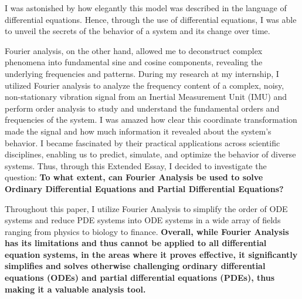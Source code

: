 \noindent
I was astonished by how elegantly this model was described in the language of differential equations. Hence, through the use of differential equations, I was able to unveil the secrets of the behavior of a system and its change over time. 

Fourier analysis, on the other hand, allowed me to deconstruct complex phenomena into fundamental sine and cosine components, revealing the underlying frequencies and patterns. 
During my research at my internship, I utilized Fourier analysis to analyze the frequency content of a complex, noisy, non-stationary vibration signal from an Inertial Measurement Unit (IMU) and perform order analysis to study and understand the fundamental orders and frequencies of the system.
I was amazed how clear this coordinate transformation made the signal and how much information it revealed about the system's behavior.
I became fascinated by their practical applications across scientific disciplines, enabling us to predict, simulate, and optimize the behavior of diverse systems. 
Thus, through this Extended Essay, I decided to investigate the question: \textbf{To what extent, can Fourier Analysis be used to solve Ordinary Differential Equations and Partial Differential Equations?}

Throughout this paper, I utilize Fourier Analysis to simplify the order of ODE systems and reduce PDE systems into ODE systems in a wide array of fields ranging from physics to biology to finance.
\textbf{Overall, while Fourier Analysis has its limitations and thus cannot be applied to all differential equation systems, in the areas where it proves effective, it significantly simplifies and solves otherwise challenging ordinary differential equations (ODEs) and partial differential equations (PDEs), thus making it a valuable analysis tool.}
